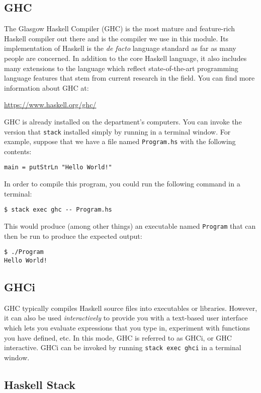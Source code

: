 \subsection{GHC}

The Glasgow Haskell Compiler (GHC) is the most mature and feature-rich Haskell compiler out there and is the compiler we use in this module. Its implementation of Haskell is the \emph{de facto} language standard as far as many people are concerned. In addition to the core Haskell language, it also includes many extensions to the language which reflect state-of-the-art programming language features that stem from current research in the field. You can find more information about GHC at:
\begin{center}
	\url{https://www.haskell.org/ghc/}
\end{center}
GHC is already installed on the department's computers. You can invoke the version that \texttt{\small stack} installed simply by running  in a terminal window. For example, suppose that we have a file named \texttt{\small Program.hs} with the following contents:
\begin{verbatim}
main = putStrLn "Hello World!"
\end{verbatim}
In order to compile this program, you could run the following command in a terminal:
\begin{verbatim}
$ stack exec ghc -- Program.hs
\end{verbatim}
This would produce (among other things) an executable named \texttt{\small Program} that can then be run to produce the expected output:
\begin{verbatim}
$ ./Program 
Hello World!
\end{verbatim}

\subsection{GHCi}

GHC typically compiles Haskell source files into executables or libraries. However, it can also be used \emph{interactively} to provide you with a text-based user interface which lets you evaluate expressions that you type in, experiment with functions you have defined, etc. In this mode, GHC is referred to as GHCi, or GHC interactive. GHCi can be invoked by running \texttt{\small stack exec ghci} in a terminal window.

\subsection{Haskell Stack} 
\label{sec:stack}

